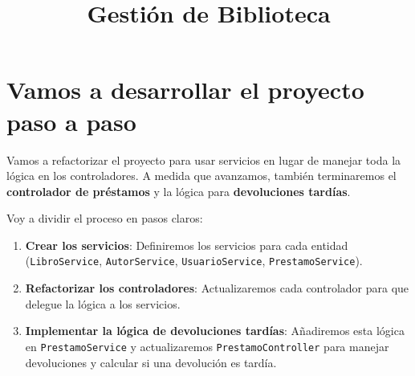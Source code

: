 \documentclass[11pt]{article}
\date{}
\title{Gestión de Biblioteca}
\begin{document}
\maketitle
\setcounter{tocdepth}{3}
\tableofcontents

\setlength\parindent{10pt}
\section{Vamos a desarrollar el proyecto paso a paso}
\label{sec:org4aa0139}

Vamos a refactorizar el proyecto para usar servicios en lugar
de manejar toda la lógica en los controladores. A medida que avanzamos,
también terminaremos el \textbf{controlador de préstamos} y la lógica para
\textbf{devoluciones tardías}.

Voy a dividir el proceso en pasos claros:

\begin{enumerate}
\item \textbf{Crear los servicios}: Definiremos los servicios para cada entidad
(\texttt{LibroService}, \texttt{AutorService}, \texttt{UsuarioService},
\texttt{PrestamoService}).
\item \textbf{Refactorizar los controladores}: Actualizaremos cada controlador
para que delegue la lógica a los servicios.
\item \textbf{Implementar la lógica de devoluciones tardías}: Añadiremos esta
lógica en \texttt{PrestamoService} y actualizaremos \texttt{PrestamoController}
para manejar devoluciones y calcular si una devolución es tardía.
\end{enumerate}
\end{document}
